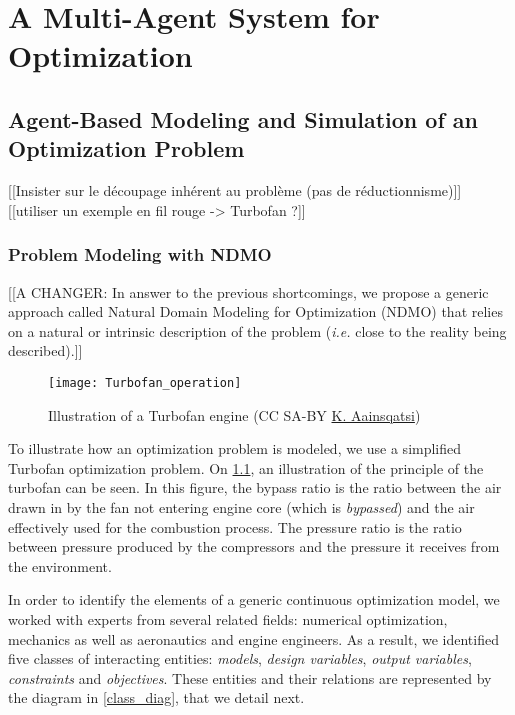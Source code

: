 \part{A Multi-Agent System for Optimization}

\chapter{Agent-Based Modeling and Simulation of an Optimization Problem}

[[Insister sur le découpage inhérent au problème (pas de réductionnisme)]]
[[utiliser un exemple en fil rouge -> Turbofan ?]]

\section{Problem Modeling with NDMO}\label{modeling}

[[A CHANGER: In answer to the previous shortcomings, we propose a generic approach called Natural Domain Modeling for Optimization (NDMO) that relies on a natural or intrinsic description of the problem (\textit{i.e.} close to the reality being described).]]

\begin{figure}[]
	\centering
	\texttt{[image: Turbofan\_operation]}
	\caption{Illustration of a Turbofan engine (CC SA-BY  \href{http://en.wikipedia.org/wiki/File:Turbofan_operation.svg}{K. Aainsqatsi})}
	\label{turbofan_illu}
\end{figure}

To illustrate how an optimization problem is modeled, we use a simplified Turbofan optimization problem. On \figurename{} \ref{turbofan_illu}, an illustration of the principle of the turbofan can be seen. In this figure, the bypass ratio is the ratio between the air drawn in by the fan not entering engine core (which is \emph{bypassed}) and the air effectively used for the combustion process. The pressure ratio is the ratio between pressure produced by the compressors and the pressure it receives from the environment.

In order to identify the elements of a generic continuous optimization model, we worked with experts from several related fields: numerical optimization, mechanics as well as aeronautics and engine engineers. As a result, we identified five classes of interacting entities: \emph{models}, \emph{design variables}, \emph{output variables}, \emph{constraints} and \emph{objectives}. These entities and their relations are represented by the diagram in \figurename{} \ref{class_diag}, that we detail next.


